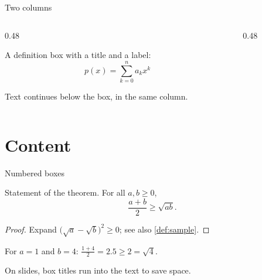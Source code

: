 \documentclass[aspectratio=169, 9pt, t, notheorems]{beamer}
\begin{document}
\begin{frame}{Two columns}
  \begin{columns}[T]
    \begin{column}{0.48\textwidth}
      \begin{definition}
        A definition box with a title and a label:
        \[ p(x) = \sum_{k=0}^{n} a_k x^k \]
      \end{definition}
      Text continues below the box, in the same column.
    \end{column}
    \begin{column}{0.48\textwidth}
      \centering
    \end{column}
  \end{columns}
\end{frame}

\section{Content}

\begin{frame}{Numbered boxes}
  \begin{theorem}
    Statement of the theorem. For all $a, b \ge 0$,
    \[ \frac{a + b}{2} \ge \sqrt{ab}. \]
  \end{theorem}
  \begin{proof}
    Expand $\bigl(\sqrt{a} - \sqrt{b}\bigr)^2 \ge 0$; see also \cref{def:sample}.
  \end{proof}
  \begin{example}
    For $a = 1$ and $b = 4$: $\frac{1 + 4}{2} = 2.5 \ge 2 = \sqrt{4}$.
  \end{example}
  \begin{remark}
    On slides, box titles run into the text to save space.
  \end{remark}
\end{frame}
\end{document}
